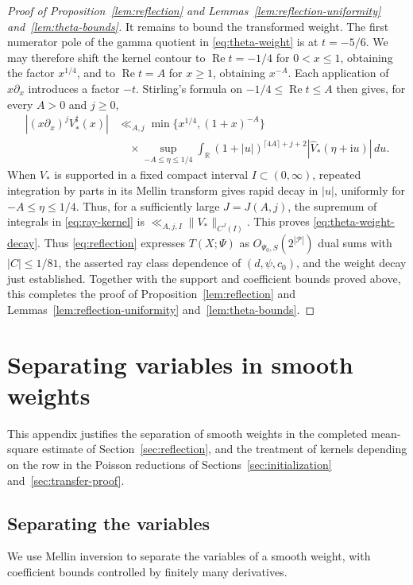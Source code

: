 \documentclass[11pt,a4paper]{article}
\numberwithin{equation}{section}
\numberwithin{figure}{section}
\theoremstyle{definition}
\theoremstyle{remark}
\newcommand{\Rea}{\operatorname{Re}}
\newcommand{\dd}{\,d}
\begin{document}
\begin{proof}[Proof of Proposition~\ref{lem:reflection} and Lemmas~\ref{lem:reflection-uniformity} and~\ref{lem:theta-bounds}]
It remains to bound the transformed weight.
The first numerator pole of the gamma quotient in
\eqref{eq:theta-weight} is at $t=-5/6$.
We may therefore shift the kernel contour to $\Rea t=-1/4$
for $0<x\le1$, obtaining the factor $x^{1/4}$, and to $\Rea t=A$
for $x\ge1$, obtaining $x^{-A}$. Each application of $x\partial_x$
introduces a factor $-t$. Stirling's formula on
$-1/4\le\Rea t\le A$ then gives, for every $A>0$ and $j\ge0$,
\begin{equation}\label{eq:ray-kernel}
\begin{aligned}
|(x\partial_x)^jV_*^\sharp(x)|
 &\ll_{A,j}\min\{x^{1/4},(1+x)^{-A}\}\\
 &\quad\times\sup_{-A\le\eta\le1/4}\int_{\mathbb R}
 (1+|u|)^{\lceil4A\rceil+j+2}|\widehat V_*(\eta+\mathrm i u)|\dd u.
\end{aligned}
\end{equation}
When $V_*$ is supported in a fixed compact interval
$I\subset(0,\infty)$, repeated integration by parts in its Mellin
transform gives rapid decay in $|u|$, uniformly for
$-A\le\eta\le1/4$. Thus, for a sufficiently large $J=J(A,j)$, the supremum of integrals in \eqref{eq:ray-kernel} is
$\ll_{A,j,I}\|V_*\|_{C^J(I)}$. This proves \eqref{eq:theta-weight-decay}.
Thus \eqref{eq:reflection} expresses $T(X;\Psi)$ as
$O_{\Psi_0,S}(2^{|\mathcal P|})$ dual sums with $|C|\le1/81$,
the asserted ray class dependence of $(d,\psi,c_0)$, and the
weight decay just established. Together with the support and
coefficient bounds proved above, this completes the proof of Proposition~\ref{lem:reflection}
and Lemmas~\ref{lem:reflection-uniformity} and~\ref{lem:theta-bounds}.
\end{proof}

\section{Separating variables in smooth weights}\label{app:weights}
This appendix justifies the separation of smooth weights in the
completed mean-square estimate of Section~\ref{sec:reflection}, and
the treatment of kernels depending on the row in the Poisson
reductions of Sections~\ref{sec:initialization} and~\ref{sec:transfer-proof}.

\subsection{Separating the variables}
We use Mellin inversion to separate the variables of a smooth
weight, with coefficient bounds controlled by finitely many derivatives.
\end{document}
